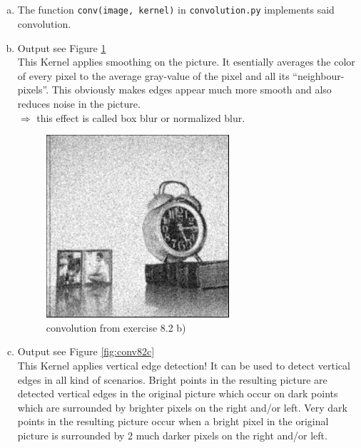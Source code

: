 \documentclass[12pt]{article}
\begin{document}
\subsection{ }
\begin{enumerate}[a)]
    \item 
        The function \verb!conv(image, kernel)! in \verb!convolution.py! implements said convolution.

    \item
        Output see Figure \ref{fig:conv82b}\\
        This Kernel applies smoothing on the picture. It esentially averages the color of every pixel to the average gray-value of the pixel and all its ``neighbour-pixels''. This obviously makes edges appear much more smooth and also reduces noise in the picture.\\
        $\Rightarrow$ this effect is called box blur or normalized blur.

        \begin{figure}
          \centering
            \includegraphics[scale = 1.00]{pictures/conv_b}
          \caption{convolution from exercise 8.2 b)}
          \label{fig:conv82b}
        \end{figure}

    \item
        Output see Figure \ref{fig:conv82c}\\
        This Kernel applies vertical edge detection! It can be used to detect vertical edges in all kind of scenarios. Bright points in the resulting picture are detected vertical edges in the original picture which occur on dark points which are surrounded by brighter pixels on the right and/or left. Very dark points in the resulting picture occur when a bright pixel in the original picture is surrounded by 2 much darker pixels on the right and/or left.\\


\end{enumerate}
\end{document}
